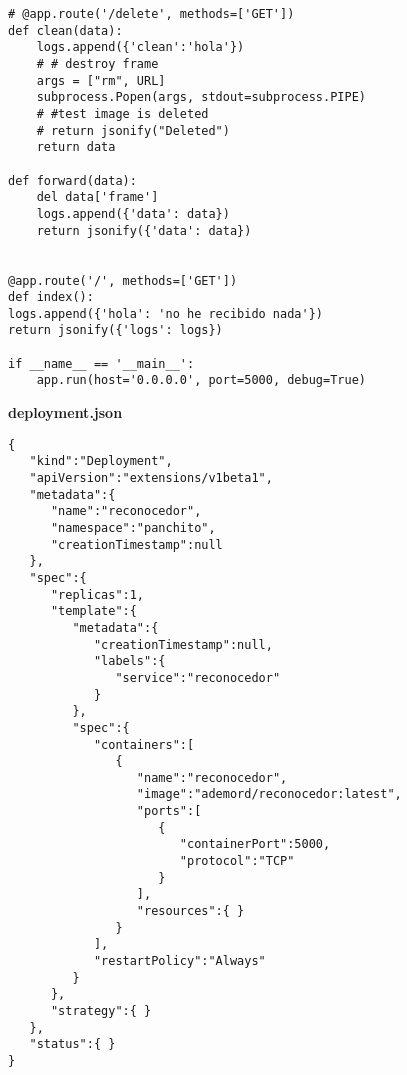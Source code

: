 \begin{mdframed}[linecolor=black, topline=true, bottomline=true,
  leftline=false, rightline=false, backgroundcolor=LightGray,userdefinedwidth=\textwidth]
\begin{verbatim}
# @app.route('/delete', methods=['GET'])
def clean(data):
    logs.append({'clean':'hola'})
    # # destroy frame
    args = ["rm", URL]
    subprocess.Popen(args, stdout=subprocess.PIPE)
    # #test image is deleted
    # return jsonify("Deleted")
    return data

def forward(data):
    del data['frame']
    logs.append({'data': data})
    return jsonify({'data': data})
	

@app.route('/', methods=['GET'])
def index():
logs.append({'hola': 'no he recibido nada'})
return jsonify({'logs': logs})

if __name__ == '__main__':
    app.run(host='0.0.0.0', port=5000, debug=True)

\end{verbatim}
\end{mdframed}
\pagebreak
{\sffamily \textbf{deployment.json}}
\begin{mdframed}[linecolor=black, topline=true, bottomline=true,
  leftline=false, rightline=false, backgroundcolor=LightGray,userdefinedwidth=\textwidth]
\begin{verbatim}
{  
   "kind":"Deployment",
   "apiVersion":"extensions/v1beta1",
   "metadata":{  
      "name":"reconocedor",
      "namespace":"panchito",
      "creationTimestamp":null
   },
   "spec":{  
      "replicas":1,
      "template":{  
         "metadata":{  
            "creationTimestamp":null,
            "labels":{  
               "service":"reconocedor"
            }
         },
         "spec":{  
            "containers":[  
               {  
                  "name":"reconocedor",
                  "image":"ademord/reconocedor:latest",
                  "ports":[  
                     {  
                        "containerPort":5000,
                        "protocol":"TCP"
                     }
                  ],
                  "resources":{ }
               }
            ],
            "restartPolicy":"Always"
         }
      },
      "strategy":{ }
   },
   "status":{ }
}
\end{verbatim}
\end{mdframed}

